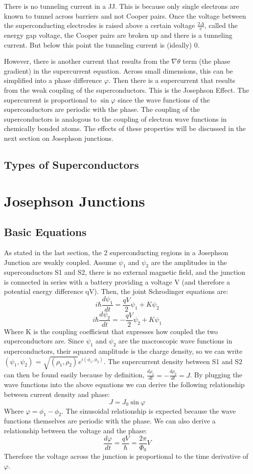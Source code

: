 \documentclass[conf]{new-aiaa}
\begin{document}
There is no tunneling current in a JJ. This is because only single electrons are known to tunnel across barriers and not Cooper pairs. Once the voltage between the superconducting electrodes is raised above a certain voltage $\frac{2\Delta}{e}$, called the energy gap voltage, the Cooper pairs are broken up and there is a tunneling current. But below this point the tunneling current is (ideally) 0. \par 
However, there is another current that results from the $\nabla \theta$ term (the phase gradient) in the supercurrent equation. Across small dimensions, this can be simplified into a phase difference $\varphi$. Then there is a supercurrent that results from the weak coupling of the superconductors. This is the Josephson Effect. The supercurrent is proportional to $\sin{\varphi}$ since the wave functions of the superconductors are periodic with the phase. The coupling of the superconductors is analogous to the coupling of electron wave functions in chemically bonded atoms. The effects of these properties will be discussed in the next section on Josephson junctions. 

\subsection{Types of Superconductors}

\pagebreak 
\section{Josephson Junctions}
\subsection{Basic Equations}
As stated in the last section, the 2 superconducting regions in a Josephson Junction are weakly coupled. Assume $\psi_1$ and $\psi_2$ are the amplitudes in the superconductors S1 and S2, there is no external magnetic field, and the junction is connected in series with a battery providing a voltage V (and therefore a potential energy difference qV). Then, the joint Schrodinger equations are: 
$$i\hbar \frac{d\psi_1}{dt} = \frac{qV}{2}\psi_1 + K\psi_2$$
$$i\hbar \frac{d\psi_2}{dt} = -\frac{qV}{2}\psi_2 + K\psi_1$$
Where K is the coupling coefficient that expresses how coupled the two superconductors are. Since $\psi_1$ and $\psi_2$ are the macroscopic wave functions in superconductors, their squared amplitude is the charge density, so we can write $(\psi_1, \psi_2)$ = $\sqrt{(\rho_1, \rho_2)}e^{i(\phi_1, \phi_2)}$. The supercurrent density between S1 and S2 can then be found easily because by definition, $\frac{d\rho_1}{dt} = -\frac{d\rho_2}{dt} = J$. By plugging the wave functions into the above equations we can derive the following relationship between current density and phase: 
$$J = J_0\sin\varphi$$
Where $\varphi = \phi_1 - \phi_2$. The sinusoidal relationship is expected because the wave functions themselves are periodic with the phase.
We can also derive a relationship between the voltage and the phase: 
$$\frac{d\varphi}{dt} = \frac{qV}{\hbar} = \frac{2\pi}{\Phi_0}V$$
Therefore the voltage across the junction is proportional to the time derivative of $\varphi$. 
\end{document}
